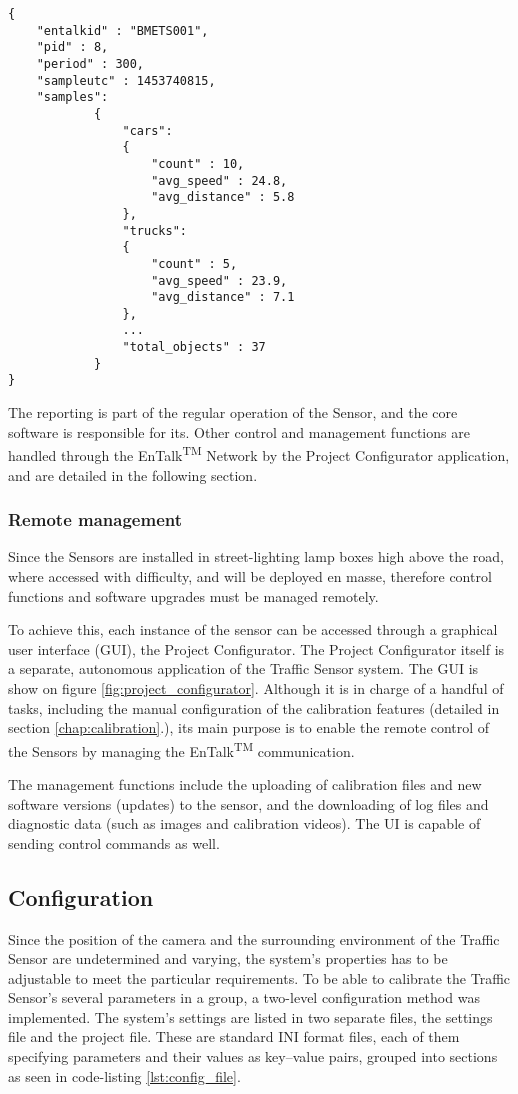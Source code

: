\begin{lstlisting}[frame=single,float=!ht,caption={Part of a report file. The result of the counting is sent as a JSON format file, including the number of vehicles detected in each category.},label=lst:report_file]
{
	"entalkid" : "BMETS001",
	"pid" : 8,
	"period" : 300,
	"sampleutc" : 1453740815,
	"samples":
			{
				"cars":
				{
					"count" : 10,
					"avg_speed" : 24.8,
					"avg_distance" : 5.8
				},
				"trucks":
				{
					"count" : 5,
					"avg_speed" : 23.9,
					"avg_distance" : 7.1
				},
				...
				"total_objects" : 37
			}
}
\end{lstlisting}

The reporting is part of the regular operation of the Sensor, and the core software is responsible for its.
Other control and management functions are handled through the EnTalk\textsuperscript{TM} Network by the Project Configurator application, and are detailed in the following section.

\subsubsection{Remote management}
Since the Sensors are installed in street-lighting lamp boxes high above the road, where accessed with difficulty, and will be deployed en masse, therefore control functions and software upgrades must be managed remotely.

To achieve this, each instance of the sensor can be accessed through a graphical user interface (GUI), the Project Configurator.
The Project Configurator itself is a separate, autonomous application of the Traffic Sensor system.
The GUI is show on figure \ref{fig:project_configurator}.
Although it is in charge of a handful of tasks, including the manual configuration of the calibration features (detailed in section \ref{chap:calibration}.), its main purpose is to enable the remote control of the Sensors by managing the EnTalk\textsuperscript{TM} communication.

The management functions include the uploading of calibration files and new software versions (updates) to the sensor, and the downloading of log files and diagnostic data (such as images and calibration videos).
The UI is capable of sending control commands as well.
\subsection{Configuration}\label{subs:ProjectConfigurator}
Since the position of the camera and the surrounding environment of the Traffic Sensor are undetermined and varying, the system's properties has to be adjustable to meet the particular requirements.
To be able to calibrate the Traffic Sensor's several parameters in a group, a two-level configuration method was implemented.
The system's settings are listed in two separate files, the settings file and the project file.
These are standard INI format files, each of them specifying parameters and their values as key--value pairs, grouped into sections as seen in code-listing \ref{lst:config_file}.

